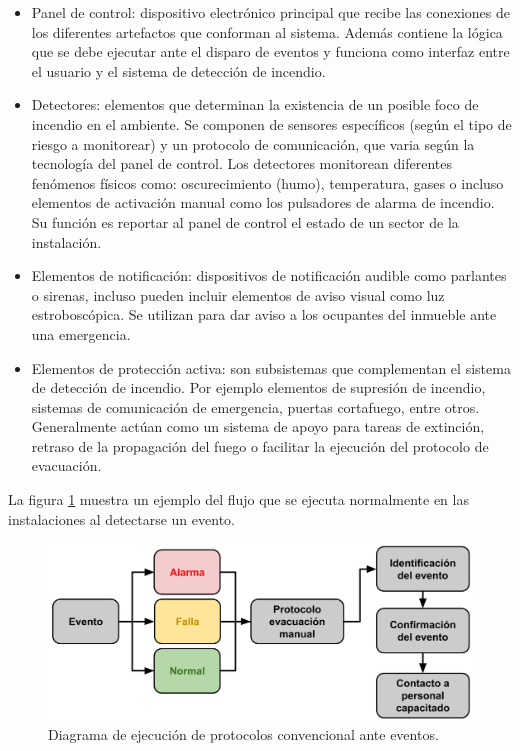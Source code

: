 \begin{itemize}
\item Panel de control: dispositivo electrónico principal que recibe las conexiones de los diferentes artefactos que conforman al sistema. Además contiene la lógica que se debe ejecutar ante el disparo de eventos y funciona como interfaz entre el usuario y el sistema de detección de incendio.
\item Detectores: elementos que determinan la existencia de un posible foco de incendio en el ambiente. Se componen de sensores específicos (según el tipo de riesgo a monitorear) y un protocolo de comunicación, que varia según la tecnología del panel de control. Los detectores monitorean diferentes fenómenos físicos como: oscurecimiento (humo), temperatura, gases o incluso elementos de activación manual como los pulsadores de alarma de incendio. Su función es reportar al panel de control el estado de un sector de la instalación.
\item Elementos de notificación: dispositivos de notificación audible como parlantes o sirenas, incluso pueden incluir elementos de aviso visual como luz estroboscópica. Se utilizan para dar aviso a los ocupantes del inmueble ante una emergencia. 
\item Elementos de protección activa: son subsistemas que complementan el sistema de detección de incendio. Por ejemplo elementos de supresión de incendio, sistemas de comunicación de emergencia, puertas cortafuego, entre otros. Generalmente actúan como un sistema de apoyo para tareas de extinción, retraso de la propagación del fuego o facilitar la ejecución del protocolo de evacuación.
\end{itemize}

La figura \ref{fig:figura_a2} muestra un ejemplo del flujo que se ejecuta normalmente en las instalaciones al detectarse un evento.

\begin{figure}[h]
	\centering
	\includegraphics[scale=.35]{./Figures/Capitulo1/FIG_B1.png}
	\caption{Diagrama de ejecución de protocolos convencional ante eventos.}
	\label{fig:figura_a2}
\end{figure}

